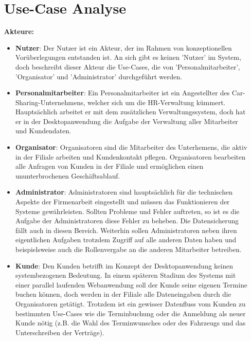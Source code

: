 \section{Use-Case Analyse}

\textbf{Akteure:}


\begin{itemize}
    \item \textbf{Nutzer}: Der Nutzer ist ein Akteur, der im Rahmen von konzeptionellen Vorüberlegungen entstanden ist. An sich gibt es keinen 'Nutzer' im System, doch beschreibt dieser Akteur die Use-Cases, die von 'Personalmitarbeiter', 'Organisator' und 'Administrator' durchgeführt werden.
    \item \textbf{Personalmitarbeiter}: Ein Personalmitarbeiter ist ein Angestellter des Car-Sharing-Unternehmens, welcher sich um die HR-Verwaltung kümmert. Hauptsächlich arbeitet er mit dem zusätzlichen Verwaltungssystem, doch hat er in der Desktopanwendung die Aufgabe der Verwaltung aller Mitarbeiter und Kundendaten.
    \item \textbf{Organisator}: Organisatoren sind die Mitarbeiter des Unterhemens, die aktiv in der Filiale arbeiten und Kundenkontakt pflegen. Organisatoren bearbeiten alle Anfragen von Kunden in der Filiale und ermöglichen einen ununterbrochenen Geschäftsablauf. 
    \item \textbf{Administrator}: Administratoren sind hauptsächlich für die technischen Aspekte der Firmenarbeit eingestellt und müssen das Funktionieren der Systeme gewährleisten. Sollten Probleme und Fehler auftreten, so ist es die Aufgabe der Administratoren diese Fehler zu beheben. Die Datensicherung fällt auch in diesen Bereich. Weiterhin sollen Administratoren neben ihren eigentlichen Aufgaben trotzdem Zugriff auf alle anderen Daten haben und beispielsweise auch die Rollenvergabe an die anderen Mitarbeiter betreiben.
    \item \textbf{Kunde}: Den Kunden betrifft im Konzept der Desktopanwendung keinen systembezogenen Bedeutung. In einem späteren Stadium des Systems mit einer parallel laufenden Webanwendung soll der Kunde seine eigenen Termine buchen können, doch werden in der Filiale alle Dateneingaben durch die Organisatoren getätigt. Trotzdem ist ein gewisser Datenfluss vom Kunden zu bestimmten Use-Cases wie die Terminbuchung oder die Anmeldung als neuer Kunde nötig (z.B. die Wahl des Terminwunsches oder des Fahrzeugs und das Unterschreiben der Verträge). 
\end{itemize}

